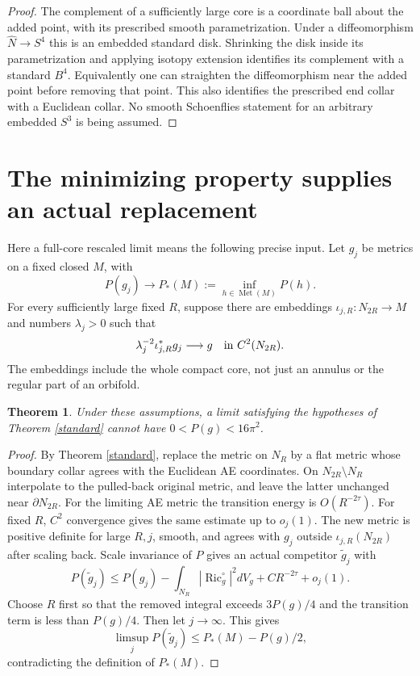 \documentclass[11pt]{article}
\newtheorem{theorem}{Theorem}
\newcommand{\Ric}{\operatorname{Ric}}
\newcommand{\Met}{\operatorname{Met}}
\begin{document}
\begin{proof}
The complement of a sufficiently large core is a coordinate ball about
the added point, with its prescribed smooth parametrization. Under a
diffeomorphism $\widehat N\to S^4$ this is an embedded standard disk.
Shrinking the disk inside its parametrization and applying isotopy extension
identifies its complement with a standard $B^4$. Equivalently one can
straighten the diffeomorphism near the added point before removing that
point. This also identifies the prescribed end collar with a Euclidean
collar. No smooth Schoenflies statement for an arbitrary embedded $S^3$
is being assumed.
\end{proof}

\section{The minimizing property supplies an actual replacement}
Here a full-core rescaled limit means the following precise input.
Let $g_j$ be metrics on a fixed closed $M$, with
\[
 P(g_j)\longrightarrow P_*(M):=\inf_{h\in\Met(M)}P(h).
\]
For every sufficiently large fixed $R$, suppose there are embeddings
$\iota_{j,R}:N_{2R}\to M$ and numbers $\lambda_j>0$ such that
\[
 \lambda_j^{-2}\iota_{j,R}^*g_j\longrightarrow g
 \quad\hbox{in }C^2(N_{2R}).
\]
The embeddings include the whole compact core, not just an annulus or the
regular part of an orbifold.

\begin{theorem}\label{replace}
Under these assumptions, a limit satisfying the hypotheses of
Theorem \ref{standard} cannot have $0<P(g)<16\pi^2$.
\end{theorem}
\begin{proof}
By Theorem \ref{standard}, replace the metric on $N_R$ by a flat metric
whose boundary collar agrees with the Euclidean AE coordinates. On
$N_{2R}\setminus N_R$ interpolate to the pulled-back original metric,
and leave the latter unchanged near $\partial N_{2R}$.
For the limiting AE metric the transition energy is $O(R^{-2\tau})$.
For fixed $R$, $C^2$ convergence gives the same estimate up to $o_j(1)$.
The new metric is positive definite for large $R,j$, smooth, and agrees
with $g_j$ outside $\iota_{j,R}(N_{2R})$ after scaling back.
Scale invariance of $P$ gives an actual competitor $\widetilde g_j$ with
\[
 P(\widetilde g_j)
 \le P(g_j)-\int_{N_R}|\Ric_g^\circ|^2dV_g
             +C R^{-2\tau}+o_j(1).
\]
Choose $R$ first so that the removed integral exceeds $3P(g)/4$ and the
transition term is less than $P(g)/4$. Then let $j\to\infty$. This gives
\[
 \limsup_j P(\widetilde g_j)\le P_*(M)-P(g)/2,
\]
contradicting the definition of $P_*(M)$.
\end{proof}
\end{document}
